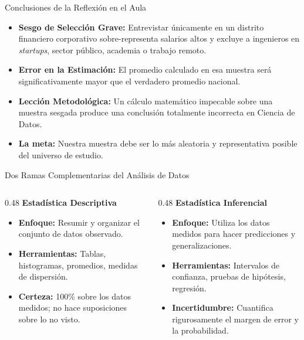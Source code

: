\documentclass[10pt,aspectratio=169]{beamer}
\begin{document}
\begin{frame}{Conclusiones de la Reflexión en el Aula}
  \begin{itemize}
    \item \textbf{Sesgo de Selección Grave:} Entrevistar únicamente en un distrito financiero corporativo sobre-representa salarios altos y excluye a ingenieros en \emph{startups}, sector público, academia o trabajo remoto. \pause
    \item \textbf{Error en la Estimación:} El promedio calculado en esa muestra será significativamente mayor que el verdadero promedio nacional. \pause
    \item \textbf{Lección Metodológica:} Un cálculo matemático impecable sobre una muestra sesgada produce una conclusión totalmente incorrecta en Ciencia de Datos. \pause
    \item \textbf{La meta:} Nuestra muestra debe ser lo más aleatoria y representativa posible del universo de estudio.
  \end{itemize}
\end{frame}

\begin{frame}{Dos Ramas Complementarias del Análisis de Datos}
  \begin{columns}[T]
    \begin{column}{0.48\textwidth}
      {\large \color{TecAzulOscuro}\textbf{Estadística Descriptiva}}
      \vspace{0.3em}
      \begin{itemize}
        \item \textbf{Enfoque:} Resumir y organizar el conjunto de datos observado. \pause
        \item \textbf{Herramientas:} Tablas, histogramas, promedios, medidas de dispersión. \pause
        \item \textbf{Certeza:} 100\% sobre los datos medidos; no hace suposiciones sobre lo no visto.
      \end{itemize}
    \end{column}
    
    \begin{column}{0.48\textwidth}
      {\large \color{TecRojo}\textbf{Estadística Inferencial}}
      \vspace{0.3em}
      \begin{itemize}
        \item \textbf{Enfoque:} Utiliza los datos medidos para hacer predicciones y generalizaciones. \pause
        \item \textbf{Herramientas:} Intervalos de confianza, pruebas de hipótesis, regresión. \pause
        \item \textbf{Incertidumbre:} Cuantifica rigurosamente el margen de error y la probabilidad.
      \end{itemize}
    \end{column}
  \end{columns}
\end{frame}
\end{document}
